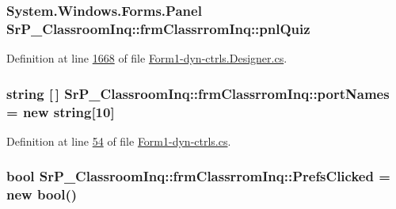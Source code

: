 \hypertarget{class_sr_p___classroom_inq_1_1frm_classrrom_inq_a482ea3246ef232cad6430e85e54a0e3a}{
\subsubsection[{pnl\-Quiz}]{\setlength{\rightskip}{0pt plus 5cm}\-System.\-Windows.\-Forms.\-Panel {\bf \-Sr\-P\-\_\-\-Classroom\-Inq\-::frm\-Classrrom\-Inq\-::pnl\-Quiz}}}
\label{class_sr_p___classroom_inq_1_1frm_classrrom_inq_a482ea3246ef232cad6430e85e54a0e3a}


\-Definition at line \hyperlink{_form1-dyn-ctrls_8_designer_8cs_source_l01668}{1668} of file \hyperlink{_form1-dyn-ctrls_8_designer_8cs_source}{\-Form1-\/dyn-\/ctrls.\-Designer.\-cs}.

\hypertarget{class_sr_p___classroom_inq_1_1frm_classrrom_inq_a9c5b06a44069e68e732d7bcd7a8fa08c}{
\subsubsection[{port\-Names}]{\setlength{\rightskip}{0pt plus 5cm}string \mbox{[}$\,$\mbox{]} {\bf \-Sr\-P\-\_\-\-Classroom\-Inq\-::frm\-Classrrom\-Inq\-::port\-Names} = new string\mbox{[}10\mbox{]}}}
\label{class_sr_p___classroom_inq_1_1frm_classrrom_inq_a9c5b06a44069e68e732d7bcd7a8fa08c}


\-Definition at line \hyperlink{_form1-dyn-ctrls_8cs_source_l00054}{54} of file \hyperlink{_form1-dyn-ctrls_8cs_source}{\-Form1-\/dyn-\/ctrls.\-cs}.

\hypertarget{class_sr_p___classroom_inq_1_1frm_classrrom_inq_a9e5a6ce376468f2e13dae9f60e86ccf6}{
\subsubsection[{\-Prefs\-Clicked}]{\setlength{\rightskip}{0pt plus 5cm}bool {\bf \-Sr\-P\-\_\-\-Classroom\-Inq\-::frm\-Classrrom\-Inq\-::\-Prefs\-Clicked} = new bool()}}
\label{class_sr_p___classroom_inq_1_1frm_classrrom_inq_a9e5a6ce376468f2e13dae9f60e86ccf6}


